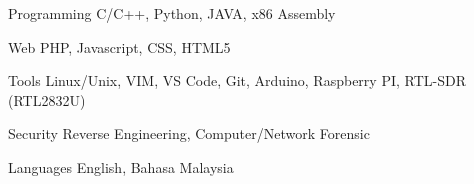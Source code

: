 

\begin{cvskills}

  \cvskill
    {Programming} %
    {C/C++, Python, JAVA, x86 Assembly} %

  \cvskill
    {Web} %
    {PHP, Javascript, CSS, HTML5} %

  \cvskill
    {Tools} %
    {Linux/Unix, VIM, VS Code, Git, Arduino, Raspberry PI, RTL-SDR (RTL2832U)} %

  \cvskill
    {Security} %
    {Reverse Engineering, Computer/Network Forensic} %

  \cvskill
    {Languages} %
    {English, Bahasa Malaysia} %

\end{cvskills}
